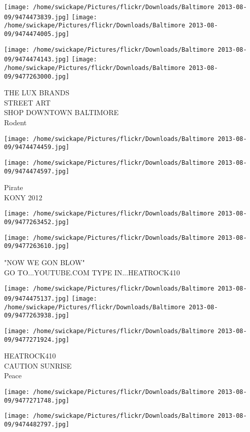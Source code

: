 \documentclass[10pt,letterpaper]{article}
\begin{document}
\texttt{[image: /home/swickape/Pictures/flickr/Downloads/Baltimore 2013-08-09/9474473839.jpg]}
\texttt{[image: /home/swickape/Pictures/flickr/Downloads/Baltimore 2013-08-09/9474474005.jpg]}

\texttt{[image: /home/swickape/Pictures/flickr/Downloads/Baltimore 2013-08-09/9474474143.jpg]}
\texttt{[image: /home/swickape/Pictures/flickr/Downloads/Baltimore 2013-08-09/9477263000.jpg]}

THE LUX BRANDS\\
STREET ART\\
SHOP DOWNTOWN BALTIMORE\\
Rodent
\pagebreak

\texttt{[image: /home/swickape/Pictures/flickr/Downloads/Baltimore 2013-08-09/9474474459.jpg]}

\vspace{0.25in}
\texttt{[image: /home/swickape/Pictures/flickr/Downloads/Baltimore 2013-08-09/9474474597.jpg]}

Pirate\\
KONY 2012
\pagebreak

\texttt{[image: /home/swickape/Pictures/flickr/Downloads/Baltimore 2013-08-09/9477263452.jpg]}

\vspace{0.25in}
\texttt{[image: /home/swickape/Pictures/flickr/Downloads/Baltimore 2013-08-09/9477263610.jpg]}

"NOW WE GON BLOW"\\
GO TO...YOUTUBE.COM TYPE IN...HEATROCK410
\pagebreak

\texttt{[image: /home/swickape/Pictures/flickr/Downloads/Baltimore 2013-08-09/9474475137.jpg]}
\texttt{[image: /home/swickape/Pictures/flickr/Downloads/Baltimore 2013-08-09/9477263938.jpg]}

\vspace{0.25in}
\texttt{[image: /home/swickape/Pictures/flickr/Downloads/Baltimore 2013-08-09/9477271924.jpg]}

HEATROCK410\\
CAUTION SUNRISE\\
Peace
\pagebreak

\texttt{[image: /home/swickape/Pictures/flickr/Downloads/Baltimore 2013-08-09/9477271748.jpg]}

\vspace{0.25in}
\texttt{[image: /home/swickape/Pictures/flickr/Downloads/Baltimore 2013-08-09/9474482797.jpg]}
\end{document}

